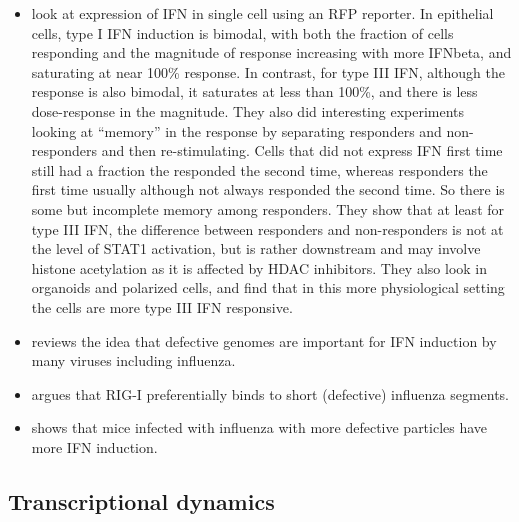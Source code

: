 \documentclass[9pt,lineno]{elife}
\begin{document}
\begin{itemize}
\item \citet{bhushal2017cell} look at expression of IFN in single cell using an RFP reporter.
In epithelial cells, type I IFN induction is bimodal, with both the fraction of cells responding and the magnitude of response increasing with more IFNbeta, and saturating at near 100\% response.
In contrast, for type III IFN, although the response is also bimodal, it saturates at less than 100\%, and there is less dose-response in the magnitude.
They also did interesting experiments looking at ``memory'' in the response by separating responders and non-responders and then re-stimulating.
Cells that did not express IFN first time still had a fraction the responded the second time, whereas responders the first time usually although not always responded the second time.
So there is some but incomplete memory among responders.
They show that at least for type III IFN, the difference between responders and non-responders is not at the level of STAT1 activation, but is rather downstream and may involve histone acetylation as it is affected by HDAC inhibitors.
They also look in organoids and polarized cells, and find that in this more physiological setting the cells are more type III IFN responsive.

\item \citet{lopez2014defective} reviews the idea that defective genomes are important for IFN induction by many viruses including influenza.

\item \citet{baum2010preference} argues that RIG-I preferentially binds to short (defective) influenza segments.

\item \citet{tapia2013defective} shows that mice infected with influenza with more defective particles have more IFN induction.

\end{itemize}

\subsection{Transcriptional dynamics}
\end{document}
